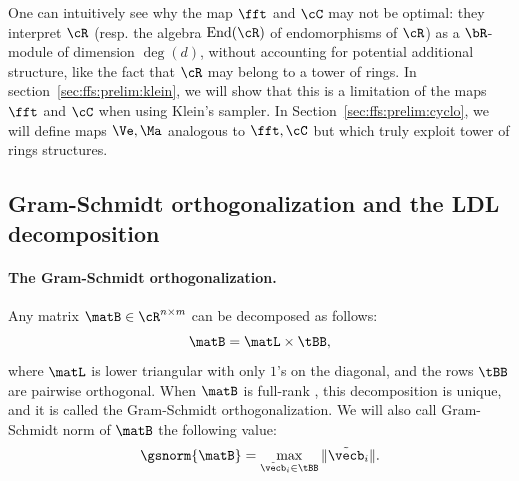 One can intuitively see why the map $\fft$ and $\cC$ may not be optimal: they interpret $\cR$ (resp. the algebra $\text{End}(\cR)$ of endomorphisms of $\cR$) as a $\bR$-module of dimension $\deg(d)$, without accounting for potential additional structure, like the fact that $\cR$ may belong to a tower of rings. In section~\ref{sec:ffs:prelim:klein}, we will show that this is a limitation of the maps $\fft$ and $\cC$ when using Klein's sampler. In Section~\ref{sec:ffs:prelim:cyclo}, we will define maps $\Ve,\Ma$ analogous to $\fft,\cC$ but which truly exploit tower of rings structures.



\subsection{Gram-Schmidt orthogonalization and the LDL decomposition}\label{sec:ffs:prelim:gso}

% 
% 

\paragraph{The Gram-Schmidt orthogonalization.}
Any matrix $\matB \in \cR^{n \times m}$ can be decomposed as follows:
\begin{equation}
 \matB = \matL \times \tBB,
\end{equation}
where $\matL$ is lower triangular with only $1$'s on the diagonal, and the rows $\tBB$ are pairwise orthogonal. When $\matB$ is full-rank , this decomposition is unique, and it is called the Gram-Schmidt orthogonalization.
We will also call Gram-Schmidt norm of $\matB$ the following value:
\begin{equation}
 \gsnorm{\matB} = \max_{\tilde\vecb_i \in \tBB} \|\tilde\vecb_i\|.
\end{equation}

